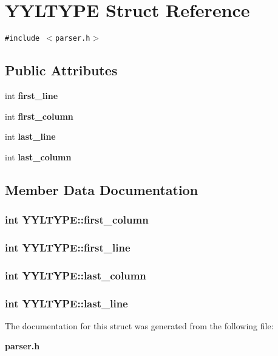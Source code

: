 \section{YYLTYPE  Struct Reference}
\label{structYYLTYPE}
{\tt \#include $<$parser.h$>$}

\subsection*{Public Attributes}
\begin{CompactItemize}
\item 
int {\bf first\_\-line}
\item 
int {\bf first\_\-column}
\item 
int {\bf last\_\-line}
\item 
int {\bf last\_\-column}
\end{CompactItemize}


\subsection{Member Data Documentation}
\subsubsection{\setlength{\rightskip}{0pt plus 5cm}int YYLTYPE::first\_\-column}\label{structYYLTYPE_m1}


\subsubsection{\setlength{\rightskip}{0pt plus 5cm}int YYLTYPE::first\_\-line}\label{structYYLTYPE_m0}


\subsubsection{\setlength{\rightskip}{0pt plus 5cm}int YYLTYPE::last\_\-column}\label{structYYLTYPE_m3}


\subsubsection{\setlength{\rightskip}{0pt plus 5cm}int YYLTYPE::last\_\-line}\label{structYYLTYPE_m2}




The documentation for this struct was generated from the following file:\begin{CompactItemize}
\item 
{\bf parser.h}\end{CompactItemize}

